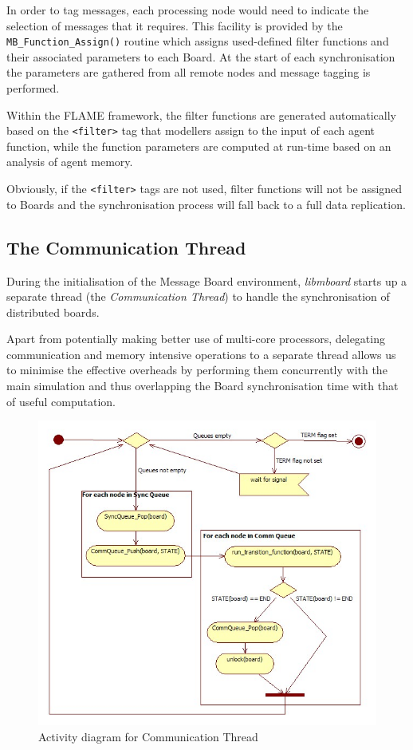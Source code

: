 In order to tag messages, each processing node would need to indicate the selection of messages that it requires. This facility is provided by the  \texttt{MB\_Function\_Assign()} routine which assigns used-defined filter functions and their associated parameters to each Board. At the start of each synchronisation the parameters are gathered from all remote nodes and message tagging is performed.

Within the FLAME framework, the filter functions are generated automatically based on the \texttt{<filter>} tag that modellers assign to the input of each agent function, while the function parameters are computed at run-time based on an analysis of agent memory. 

Obviously, if the \texttt{<filter>} tags are not used, filter functions will not be assigned to Boards and the synchronisation process will fall back to a full data replication.

\subsection{The Communication Thread}
\label{sec:commthread}

During the initialisation of the Message Board environment, \textit{libmboard} starts up a separate thread (the \textit{Communication Thread}) to handle the synchronisation of distributed boards. 

Apart from potentially making better use of multi-core processors, delegating communication and memory intensive operations to a separate thread allows us to minimise the effective overheads by performing them concurrently with the main simulation and thus overlapping the Board synchronisation time with that of useful computation.

\begin{figure}[ht]
 \centering
  \includegraphics[scale=0.60]{commloop.jpg}
 \caption{Activity diagram for Communication Thread}
 \label{fig:commloop}
\end{figure}


